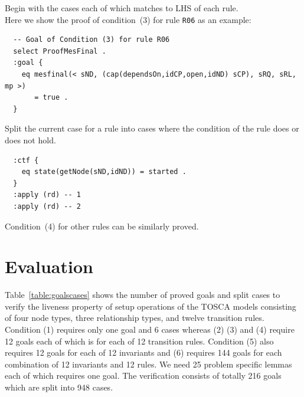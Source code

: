 \documentclass[12pt]{report}
\begin{document}
 Begin with the cases each of which matches to
LHS of each rule. \\ 
Here we show the proof of condition~(3) for rule {\tt R06}
as an example:
\small
\begin{verbatim}
  -- Goal of Condition (3) for rule R06
  select ProofMesFinal .
  :goal {
    eq mesfinal(< sND, (cap(dependsOn,idCP,open,idND) sCP), sRQ, sRL, mp >)
       = true .
  }
\end{verbatim}
\normalsize

 Split the current case for a rule into
cases where the condition of the rule does or does not hold. 
\small
\begin{verbatim}
  :ctf {
    eq state(getNode(sND,idND)) = started .
  }
  :apply (rd) -- 1
  :apply (rd) -- 2
\end{verbatim}
\normalsize
Condition~(4) for other rules can be similarly proved.

\section{Evaluation}
\label{sec:evaluation}
Table~\ref{table:goalscases} shows the number of proved goals and
split cases to verify the liveness property of setup operations of the
TOSCA models consisting of four node types, three relationship types,
and twelve transition rules. Condition (1) requires only one goal and
6 cases whereas (2) (3) and (4) require 12 goals each of which
is for each of 12 transition rules. Condition (5) also requires 12
goals for each of 12 invariants and (6) requires 144 goals for
each combination of 12 invariants and 12 rules. We need 25
problem specific lemmas each of which requires one goal.
The verification consists of totally 216 goals which
are split into 948 cases.
\end{document}
